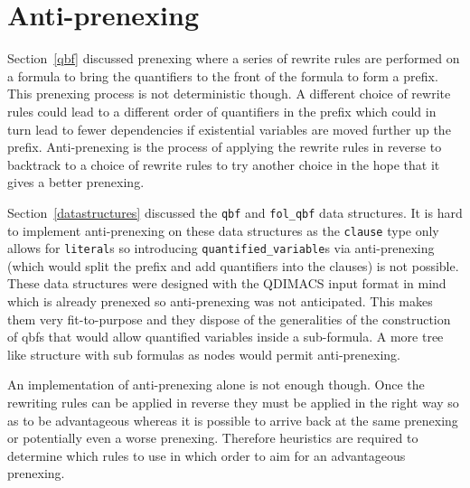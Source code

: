 \section{Anti-prenexing}
Section~\ref{qbf} discussed prenexing where a series of rewrite rules are performed on a formula to bring the quantifiers to the front of the formula to form a prefix. This prenexing process is not deterministic though. A different choice of rewrite rules could lead to a different order of quantifiers in the prefix which could in turn lead to fewer dependencies if existential variables are moved further up the prefix. Anti-prenexing is the process of applying the rewrite rules in reverse to backtrack to a choice of rewrite rules to try another choice in the hope that it gives a better prenexing.

Section~\ref{datastructures} discussed the \texttt{qbf} and \texttt{fol\_qbf} data structures. It is hard to implement anti-prenexing on these data structures as the \texttt{clause} type only allows for \texttt{literal}s so introducing \texttt{quantified\_variable}s via anti-prenexing (which would split the prefix and add quantifiers into the clauses) is not possible. These data structures were designed with the QDIMACS input format in mind which is already prenexed so anti-prenexing was not anticipated. This makes them very fit-to-purpose and they dispose of the generalities of the construction of \glspl{qbf} that would allow quantified variables inside a sub-formula. A more tree like structure with sub formulas as nodes would permit anti-prenexing.

An implementation of anti-prenexing alone is not enough though. Once the rewriting rules can be applied in reverse they must be applied in the right way so as to be advantageous whereas it is possible to arrive back at the same prenexing or potentially even a worse prenexing. Therefore heuristics are required to determine which rules to use in which order to aim for an advantageous prenexing.
